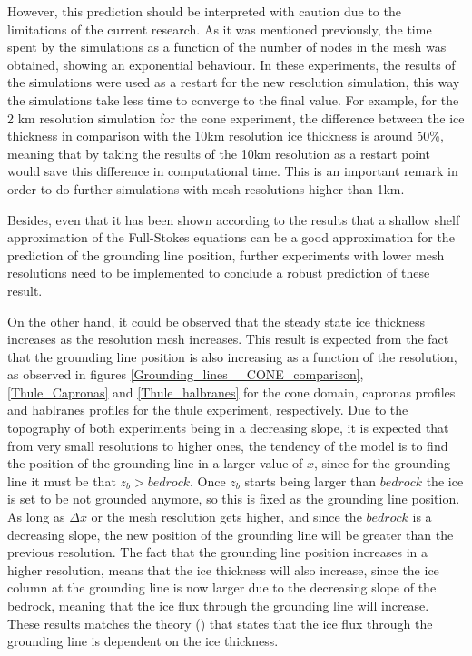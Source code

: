 \documentclass{article}
\begin{document}
However, this prediction should be interpreted with caution due to the limitations of the current research. As it was mentioned previously, the time spent by the simulations as a function of the number of nodes in the mesh was obtained, showing an exponential behaviour. In these experiments, the results of the simulations were used as a restart for the new resolution simulation, this way the simulations take less time to converge to the final value. For example, for the 2 km resolution simulation for the cone experiment, the difference between the ice thickness in comparison with the 10km resolution ice thickness is around 50\%, meaning that by taking the results of the 10km resolution as a restart point would save this difference in computational time. This is an important remark in order to do further simulations with mesh resolutions higher than 1km.

Besides, even that it has been shown according to the results that a shallow shelf approximation of the Full-Stokes equations can be a good approximation for the prediction of the grounding line position, further experiments with lower mesh resolutions need to be implemented to conclude a robust prediction of these result. 

On the other hand, it could be observed that the steady state ice thickness increases as the resolution mesh increases. This result is expected from the fact that the grounding line position is also increasing as a function of the resolution, as observed in figures \ref{Grounding_lines__CONE_comparison}, \ref{Thule_Capronas} and \ref{Thule_halbranes} for the cone domain, capronas profiles and hablranes profiles for the thule experiment, respectively. Due to the topography of both experiments being in a decreasing slope, it is expected that from very small resolutions to higher ones, the tendency of the model is to find the position of the grounding line in a larger value of $x$, since for the grounding line it must be that $z_b > bedrock$. Once $z_b$ starts being larger than $bedrock$ the ice is set to be not grounded anymore, so this is fixed as the grounding line position. As long as $\Delta x$ or the mesh resolution gets higher, and since the $bedrock$ is a decreasing slope, the new position of the grounding line will be greater than the previous resolution. The fact that the grounding line position increases in a higher resolution, means that the ice thickness will also increase, since the ice column at the grounding line is now larger due to the decreasing slope of the bedrock, meaning that the ice flux through the grounding line will increase. These results matches the theory (\cite{weertman1974stability, schoof2007ice}) that states that the ice flux through the grounding line is dependent on the ice thickness. 
\end{document}
